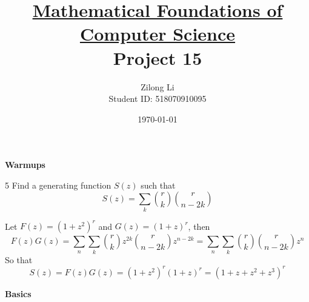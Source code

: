 \documentclass[a4paper,12pt]{article}
\title{\small \underline{Mathematical Foundations of Computer Science}\\\Large Project 15}
\author{Zilong Li\\\small Student ID: 518070910095}
\date{\today}
\makeatletter
\newtheorem*{solution}{Solution}
\theoremstyle{definition}
\renewenvironment{solution}[1][Solution] {\par\pushQED{\qed}\normalfont\topsep6\p@\@plus6\p@\relax\trivlist\item[\hskip\labelsep\bfseries#1\@addpunct{.}]\ignorespaces}{\popQED\endtrivlist\@endpefalse} \makeatother
\newenvironment{problems}{\begin{list}{}{\renewcommand{\makelabel}[1]{\textbf{##1}\hfil}}}{\end{list}}
\makeatother
\begin{document}
\maketitle

\noindent\textbf{Warmups}

\begin{problems}
   \item[5]Find a generating function $S(z)$ such that
   \begin{equation*}
        [z^n]S(z) = \sum_k \binom{r}{k} \binom{r}{n-2k}
   \end{equation*}
   \begin{solution}
      Let $F(z)=(1+z^2)^r$ and $G(z)=(1+z)^r$, then
      \begin{equation*}
         F(z)G(z) = \sum_{n}\sum_{k} \binom{r}{k} z^{2k} \binom{r}{n-2k} z^{n-2k} = \sum_{n}\sum_{k} \binom{r}{k}\binom{r}{n-2k} z^n
      \end{equation*}
      So that
      \begin{equation*}
         S(z) = F(z)G(z) = (1+z^2)^r (1+z)^r = (1+z+z^2+z^3)^r
      \end{equation*}
   \end{solution}
\end{problems}

\noindent\textbf{Basics}
\end{document}

